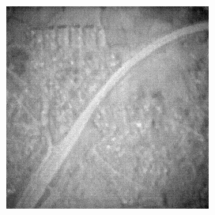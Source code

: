 \begin{figure}
\begin{subfigure}[b]{0.19\textwidth}
    \end{subfigure}
    \hfill
    \begin{subfigure}[b]{0.19\textwidth}
        \centering
        \includegraphics[width=\textwidth]{../figs/outputs/mono/508.png}
    \end{subfigure}    
    

\end{figure}

